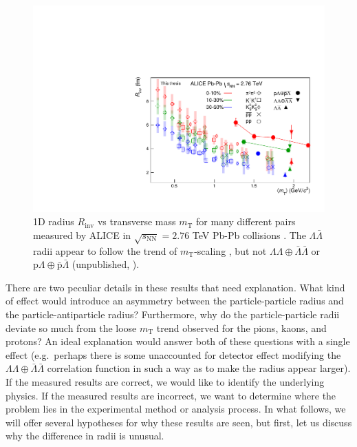 \begin{figure}[hbt]
\includegraphics[width=36pc]{Figures/FitResults/2016-09-29-mTscaling.pdf}
\caption[$R_{\mathrm{inv}}$ vs $m_{\mathrm{T}}$]{1D radius $R_\mathrm{inv}$ vs transverse mass $m_\mathrm{T}$ for many different pairs measured by ALICE in $\sqrt{s_\mathrm{NN}} = 2.76$ TeV Pb-Pb collisions \cite{Adam:2015vja}.
The $\Lambda\bar{\Lambda}$ radii appear to follow the trend of $m_\mathrm{T}$-scaling \cite{Csorgo:1995bi,Lisa:2005dd}, but not $\Lambda\Lambda\oplus\bar{\Lambda}\bar{\Lambda}$ or $\mathrm{p}\Lambda\oplus\bar{\mathrm{p}}\bar{\Lambda}$ (unpublished, \cite{Beck:2015msi}).
}
\label{fig:RvsMt}
\end{figure}

There are two peculiar details in these results that need explanation.
What kind of effect would introduce an asymmetry between the particle-particle radius and the particle-antiparticle radius? 
Furthermore, why do the particle-particle radii deviate so much from the loose $m_\mathrm{T}$ trend observed for the pions, kaons, and protons?
An ideal explanation would answer both of these questions with a single effect (e.g.\ perhaps there is some unaccounted for detector effect modifying the $\Lambda\Lambda\oplus\bar{\Lambda}\bar{\Lambda}$ correlation function in such a way as to make the radius appear larger).
If the measured results are correct, we would like to identify the underlying physics.
If the measured results are incorrect, we want to determine where the problem lies in the experimental method or analysis process.
In what follows, we will offer several hypotheses for why these results are seen, but first, let us discuss why the difference in radii is unusual.

